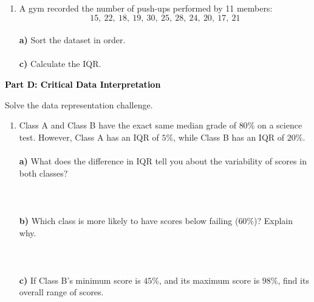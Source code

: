 \documentclass[12pt, letterpaper, fleqn]{article}
\begin{document}
\vspace{5mm}

\begin{enumerate}[itemsep=2.5cm, leftmargin=0.6cm]
\item A gym recorded the number of push-ups performed by 11 members: \\
$$15, \ 22, \ 18, \ 19, \ 30, \ 25, \ 28, \ 24, \ 20, \ 17, \ 21$$ \\
\textbf{a)} Sort the dataset in order. \\
\vspace{1cm} \\
\textbf{c)} Calculate the IQR. \\
\vspace{1cm}
\end{enumerate}

\begin{tcolorbox}[colback=black!10]
    \large\textcolor{black}{\textbf{Part D: Critical Data Interpretation}}
\end{tcolorbox}

\vspace{3mm}

\noindent
Solve the data representation challenge.

\vspace{5mm}

\begin{enumerate}[itemsep=2.5cm, leftmargin=0.6cm]
\item Class A and Class B have the exact same median grade of $80\%$ on a science test. However, Class A has an IQR of $5\%$, while Class B has an IQR of $20\%$. \\ \\
\textbf{a)} What does the difference in IQR tell you about the variability of scores in both classes? \\ \\
\\ \\
\textbf{b)} Which class is more likely to have scores below failing ($60\%$)? Explain why. \\ \\
 \\ \\
\textbf{c)} If Class B's minimum score is $45\%$, and its maximum score is $98\%$, find its overall range of scores. \\ \\

\end{enumerate}
\end{document}
